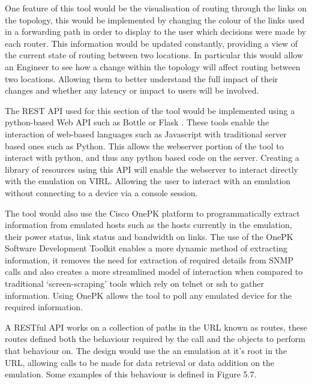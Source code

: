 \documentclass[11pt]{report}
\begin{document}
One feature of this tool would be the visualisation of routing through the links on the topology, this would be implemented by changing the colour of the links used in a forwarding path in order to display to the user which decisions were made by each router. This information would be updated constantly, providing a view of the current state of routing between two locations. In particular this would allow an Engineer to see how a change within the topology will affect routing between two locations. Allowing them to better understand the full impact of their changes and whether any latency or impact to users will be involved.

The REST API used for this section of the tool would be implemented using a python-based Web API such as Bottle \citep{Bottle} or Flask \citep{Flask}. These tools enable the interaction of web-based languages such as Javascript with traditional server based ones such as Python. This allows the webserver portion of the tool to interact with python, and thus any python based code on the server. Creating a library of resources using this API will enable the webserver to interact directly with the emulation on VIRL. Allowing the user to interact with an emulation without connecting to a device via a console session.

The tool would also use the Cisco OnePK \citep{OnePK} platform to programmatically extract information from emulated hosts such as the hosts currently in the emulation, their power status, link status and bandwidth on links. The use of the OnePK Software Development Toolkit enables a more dynamic method of extracting information, it removes the need for extraction of required details from SNMP calls and also creates a more streamlined model of interaction when compared to traditional `screen-scraping' tools which rely on telnet or ssh to gather information. Using OnePK allows the tool to poll any emulated device for the required information.

A RESTful API works on a collection of paths in the URL known as routes, these routes defined both the behaviour required by the call and the objects to perform that behaviour on. The design would use the an emulation at it's root in the URL, allowing calls to be made for data retrieval or data addition on the emulation. Some examples of this behaviour is defined in Figure 5.7.
\end{document}
